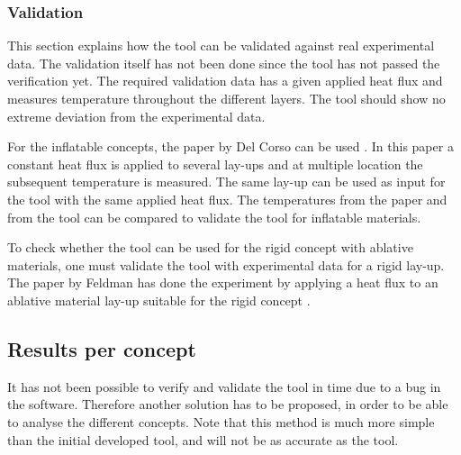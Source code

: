 
\subsubsection{Validation}
This section explains how the tool can be validated against real experimental data. The validation itself has not been done since the tool has not passed the verification yet. The required validation data has a given applied heat flux and measures temperature throughout the different layers. The tool should show no extreme deviation from the experimental data. 

For the inflatable concepts, the paper by Del Corso can be used \cite{Corso2009}. In this paper a constant heat flux is applied to several lay-ups and at multiple location the subsequent temperature is measured. The same lay-up can be used as input for the tool with the same applied heat flux. The temperatures from the paper and from the tool can be compared to validate the tool for inflatable materials. 

To check whether the tool can be used for the rigid concept with ablative materials, one must validate the tool with experimental data for a rigid lay-up. The paper by Feldman has done the experiment by applying a heat flux to an ablative material lay-up suitable for the rigid concept \cite{Feldman2012}.


\subsection{Results per concept}
It has not been possible to verify and validate the tool in time due to a bug in the software. Therefore another solution has to be proposed, in order to be able to analyse the different concepts. Note that this method is much more simple than the initial developed tool, and will not be as accurate as the tool. 

